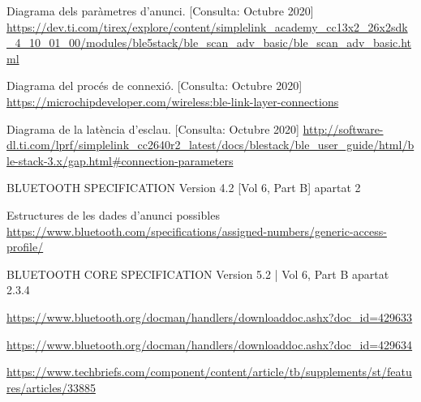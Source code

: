 \begin{thebibliography}{2}
Diagrama dels paràmetres d'anunci.
[Consulta: Octubre 2020] \newline
\href{https://dev.ti.com/tirex/explore/content/simplelink\_academy\_cc13x2\_26x2sdk\_4\_10\_01\_00/modules/ble5stack/ble\_scan\_adv\_basic/ble\_scan\_adv\_basic.html}{https://dev.ti.com/tirex/explore/content/simplelink\_academy\_cc13x2\_26x2sdk\_4\_10\_01\_00/modules/ble5stack/ble\_scan\_adv\_basic/ble\_scan\_adv\_basic.html}

Diagrama del procés de connexió.
[Consulta: Octubre 2020] \newline
\href{https://microchipdeveloper.com/wireless:ble-link-layer-connections}{https://microchipdeveloper.com/wireless:ble-link-layer-connections}

Diagrama de la latència d'esclau.
[Consulta: Octubre 2020] \newline
\href{http://software-dl.ti.com/lprf/simplelink\_cc2640r2\_latest/docs/blestack/ble\_user\_guide/html/ble-stack-3.x/gap.html\#connection-parameters}{http://software-dl.ti.com/lprf/simplelink\_cc2640r2\_latest/docs/blestack/ble\_user\_guide/html/ble-stack-3.x/gap.html\#connection-parameters}

BLUETOOTH SPECIFICATION Version 4.2 [Vol 6, Part B] apartat 2 

Estructures de les dades d'anunci possibles \newline
\href{https://www.bluetooth.com/specifications/assigned-numbers/generic-access-profile/}{https://www.bluetooth.com/specifications/assigned-numbers/generic-access-profile/}

BLUETOOTH CORE SPECIFICATION Version 5.2 | Vol 6, Part B apartat 2.3.4

\href{https://www.bluetooth.org/docman/handlers/downloaddoc.ashx?doc_id=429633}{https://www.bluetooth.org/docman/handlers/downloaddoc.ashx?doc\_id=429633}

\href{https://www.bluetooth.org/docman/handlers/downloaddoc.ashx?doc_id=429634}{https://www.bluetooth.org/docman/handlers/downloaddoc.ashx?doc\_id=429634}


\href{https://www.techbriefs.com/component/content/article/tb/supplements/st/features/articles/33885}{https://www.techbriefs.com/component/content/article/tb/supplements/st/features/articles/33885}


\end{thebibliography}
